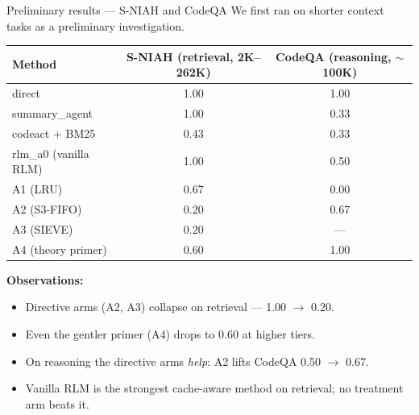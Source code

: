 \documentclass[aspectratio=169,10pt]{beamer}
\begin{document}
\begin{frame}{Preliminary results --- S-NIAH and CodeQA}
\small We first ran on shorter context tasks as a preliminary investigation.

\vspace{0.4em}
\begin{center}
\renewcommand{\arraystretch}{1.1}
\scriptsize
\begin{tabular}{@{}l c c@{}}
\toprule
\textbf{Method} & \textbf{S-NIAH} (retrieval, 2K--262K) & \textbf{CodeQA} (reasoning, $\sim$100K) \\
\midrule
direct                & 1.00 & 1.00 \\
summary\_agent        & 1.00 & 0.33 \\
codeact + BM25        & 0.43 & 0.33 \\
\midrule
\rowcolor{crimson!5}rlm\_a0 (vanilla RLM) & 1.00 & 0.50 \\
A1 (LRU)              & 0.67 & 0.00 \\
A2 (S3-FIFO)          & \alert{0.20} & 0.67 \\
A3 (SIEVE)            & \alert{0.20} & --- \\
A4 (theory primer)    & 0.60 & 1.00 \\
\bottomrule
\end{tabular}
\end{center}

\vspace{0.4em}
\footnotesize\textbf{Observations:}
\begin{itemize}\setlength{\itemsep}{0.05em}
  \item Directive arms (A2, A3) collapse on retrieval --- 1.00 $\to$ 0.20.
  \item Even the gentler primer (A4) drops to 0.60 at higher tiers.
  \item On reasoning the directive arms \emph{help}: A2 lifts CodeQA 0.50 $\to$ 0.67.
  \item Vanilla RLM is the strongest cache-aware method on retrieval; no treatment arm beats it.
\end{itemize}
\end{frame}
\end{document}
